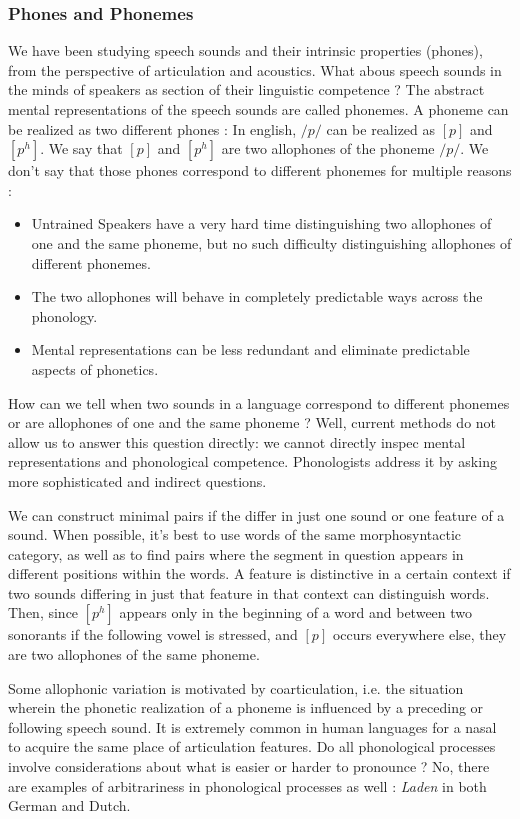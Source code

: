 \documentclass{cours}
\begin{document}
\subsubsection{Phones and Phonemes}
We have been studying speech sounds and their intrinsic properties (phones), from the perspective of articulation and acoustics. What abous speech sounds in the minds of speakers as section of their linguistic competence ? The abstract mental representations of the speech sounds are called phonemes.
A phoneme can be realized as two different phones\! : In english, $/p/$ can be realized as $[p]$ and $[p^{h}]$. We say that $[p]$ and $[p^{h}]$ are two allophones of the phoneme $/p/$. 
We don't say that those phones correspond to different phonemes for multiple reasons\! : 
\begin{itemize}
    \item Untrained Speakers have a very hard time distinguishing two allophones of one and the same phoneme, but no such difficulty distinguishing allophones of different phonemes. 
    \item The two allophones will behave in completely predictable ways across the phonology.
    \item Mental representations can be less redundant and eliminate predictable aspects of phonetics. 
\end{itemize}
How can we tell when two sounds in a language correspond to different phonemes or are allophones of one and the same phoneme ? Well, current methods do not allow us to answer this question directly\!: we cannot directly inspec mental representations and phonological competence. Phonologists address it by asking more sophisticated and indirect questions.

We can construct minimal pairs if the differ in just one sound or one feature of a sound. When possible, it's best to use words of the same morphosyntactic category, as well as to find pairs where the segment in question appears in different positions within the words. A feature is distinctive in a certain context if two sounds differing in just that feature in that context can distinguish words. 
Then, since $[p^{h}]$ appears only in the beginning of a word and between two sonorants if the following vowel is stressed, and $[p]$ occurs everywhere else, they are two allophones of the same phoneme. 

Some allophonic variation is motivated by coarticulation, i.e. the situation wherein the phonetic realization of a phoneme is influenced by a preceding or following speech sound. 
It is extremely common in human languages for a nasal to acquire the same place of articulation features. Do all phonological processes involve considerations about what is easier or harder to pronounce ? No, there are examples of arbitrariness in phonological processes as well\! : \textsl{Laden} in both German and Dutch.
\end{document}
